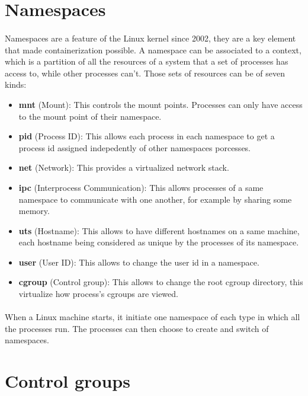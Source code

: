 \section{Namespaces}
\paragraph{}Namespaces are a feature of the Linux kernel since 2002, they are a key element that made containerization possible.  A namespace can be associated to a context, which is a partition of all the resources of a system that a set of processes has access to, while other processes can't.  Those sets of resources can be of seven kinds:
\begin{itemize}
\renewcommand\labelitemi{--}
  \item \textbf{mnt} (Mount): This controls the mount points.  Processes can only have access to the mount point of their namespace.
  \item \textbf{pid} (Process ID): This allows each process in each namespace to get a process id assigned indepedently of other namespaces porcesses.
  \item \textbf{net} (Network): This provides a virtualized network stack.
  \item \textbf{ipc} (Interprocess Communication): This allows processes of a same namespace to communicate with one another, for example by sharing some memory.
  \item \textbf{uts} (Hostname): This allows to have different hostnames on a same machine, each hostname being considered as unique by the processes of its namespace.
  \item \textbf{user} (User ID): This allows to change the user id in a namespace.
  \item \textbf{cgroup} (Control group): This allows to change the root cgroup directory, this virtualize how process's cgroups are viewed.
\end{itemize}

\paragraph{}When a Linux machine starts, it initiate one namespace of each type in which all the processes run.  The processes can then choose to create and switch of namespaces.

\section{Control groups}

